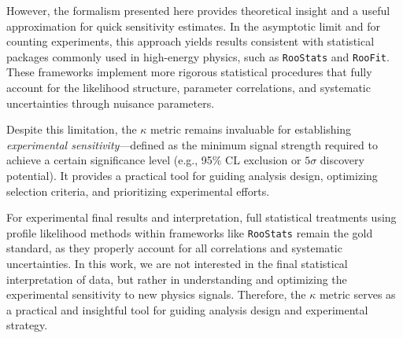 However, the formalism presented here provides theoretical insight and a useful approximation for quick sensitivity estimates. In the asymptotic limit and for counting experiments, this approach yields results consistent with statistical packages commonly used in high-energy physics, such as \texttt{RooStats} and \texttt{RooFit}. These frameworks implement more rigorous statistical procedures that fully account for the likelihood structure, parameter correlations, and systematic uncertainties through nuisance parameters.


Despite this limitation, the $\kappa$ metric remains invaluable for establishing \textit{experimental sensitivity}—defined as the minimum signal strength required to achieve a certain significance level (e.g., 95\% CL exclusion or $5\sigma$ discovery potential). It provides a practical tool for guiding analysis design, optimizing selection criteria, and prioritizing experimental efforts. 

For experimental final results and interpretation, full statistical treatments using profile likelihood methods within frameworks like \texttt{RooStats} remain the gold standard, as they properly account for all correlations and systematic uncertainties. In this work, we are not interested in the final statistical interpretation of data, but rather in understanding and optimizing the experimental sensitivity to new physics signals. Therefore, the $\kappa$ metric serves as a practical and insightful tool for guiding analysis design and experimental strategy.
